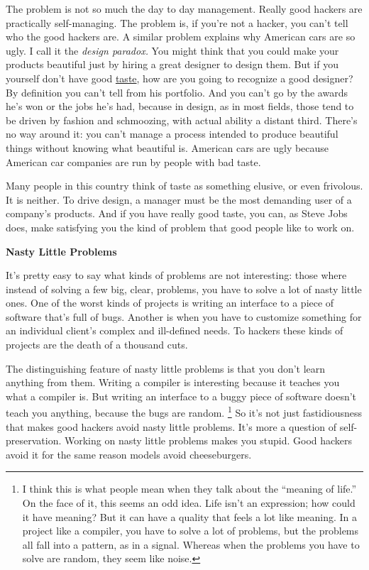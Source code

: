 \documentclass[12pt]{book}
\begin{document}
The problem is not so much the day to day management. Really good
hackers are practically self-managing. The problem is, if you're not a
hacker, you can't tell who the good hackers are. A similar problem
explains why American cars are so ugly. I call it the \emph{design
paradox.} You might think that you could make your products beautiful
just by hiring a great designer to design them. But if you yourself
don't have good \href{taste.html}{taste}, how are you going to recognize
a good designer? By definition you can't tell from his portfolio. And
you can't go by the awards he's won or the jobs he's had, because in
design, as in most fields, those tend to be driven by fashion and
schmoozing, with actual ability a distant third. There's no way around
it: you can't manage a process intended to produce beautiful things
without knowing what beautiful is. American cars are ugly because
American car companies are run by people with bad taste.

Many people in this country think of taste as something elusive, or even
frivolous. It is neither. To drive design, a manager must be the most
demanding user of a company's products. And if you have really good
taste, you can, as Steve Jobs does, make satisfying you the kind of
problem that good people like to work on.

\textbf{Nasty Little Problems}

It's pretty easy to say what kinds of problems are not interesting:
those where instead of solving a few big, clear, problems, you have to
solve a lot of nasty little ones. One of the worst kinds of projects is
writing an interface to a piece of software that's full of bugs. Another
is when you have to customize something for an individual client's
complex and ill-defined needs. To hackers these kinds of projects are
the death of a thousand cuts.

The distinguishing feature of nasty little problems is that you don't
learn anything from them. Writing a compiler is interesting because it
teaches you what a compiler is. But writing an interface to a buggy
piece of software doesn't teach you anything, because the bugs are
random. \footnote{I think this is what people mean when they talk about the
``meaning of life.'' On the face of it, this seems an odd idea. Life
isn't an expression; how could it have meaning? But it can have a
quality that feels a lot like meaning. In a project like a compiler, you
have to solve a lot of problems, but the problems all fall into a
pattern, as in a signal. Whereas when the problems you have to solve are
random, they seem like noise.} So it's not just fastidiousness that makes good hackers
avoid nasty little problems. It's more a question of self-preservation.
Working on nasty little problems makes you stupid. Good hackers avoid it
for the same reason models avoid cheeseburgers.
\end{document}
